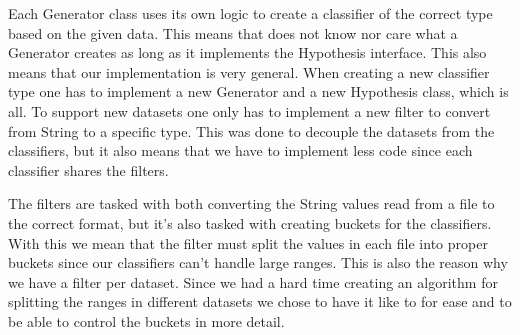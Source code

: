 Each Generator class uses its own logic to create a classifier of the correct type
based on the given data. This means that \adaboost{} does not know nor care what
a Generator creates as long as it implements the Hypothesis interface. This also
means that our implementation is very general. When creating a new classifier type
one has to implement a new Generator and a new Hypothesis class, which is all. To
support new datasets one only has to implement a new filter to convert from String
to a specific type. This was done to decouple the datasets from the classifiers, but
it also means that we have to implement less code since each classifier shares the
filters.

The filters are tasked with both converting the String values read from a file to
the correct format, but it's also tasked with creating buckets for the classifiers.
With this we mean that the filter must split the values in each file into proper
buckets since our classifiers can't handle large ranges. This is also the reason
why we have a filter per dataset. Since we had a hard time creating an algorithm
for splitting the ranges in different datasets we chose to have it like to for ease
and to be able to control the buckets in more detail.
